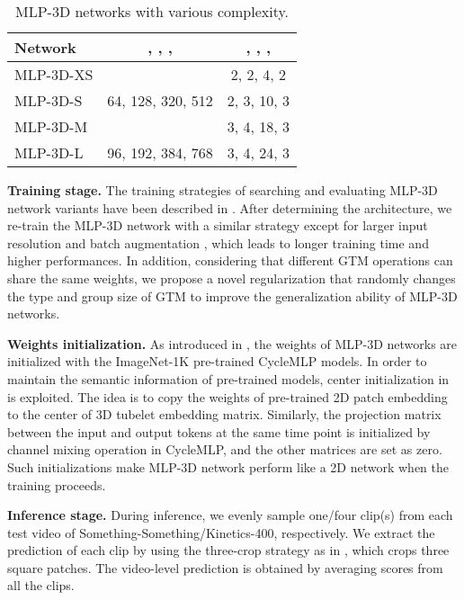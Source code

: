 \documentclass[10pt,twocolumn,letterpaper]{article}
\begin{document}
\begin{table}[!tb]
\centering
\small
\caption{\small MLP-3D networks with various complexity.}
\vspace{-0.1in}
\begin{tabularx}{0.42\textwidth}{X|c|c}
\toprule
\textbf{Network} & , , ,  & , , ,  \\
\midrule
MLP-3D-XS & \multirow{3}{*}{64, 128, 320, 512} & 2, 2, 4, 2 \\
MLP-3D-S &  & 2, 3, 10, 3 \\
MLP-3D-M &  & 3, 4, 18, 3 \\ \midrule
MLP-3D-L & 96, 192, 384, 768 & 3, 4, 24, 3 \\
\bottomrule
\end{tabularx}
\label{tab:ss}
\vspace{-0.2in}
\end{table}

\textbf{Training stage.} The training strategies of searching and evaluating MLP-3D network variants have been described in . After determining the architecture, we re-train the MLP-3D network with a similar strategy except for larger input resolution and batch augmentation \cite{hoffer2020augment}, which leads to longer training time and higher performances. In addition, considering that different GTM operations can share the same weights, we propose a novel regularization that randomly changes the type and group size of GTM to improve the generalization ability of MLP-3D networks.

\textbf{Weights initialization.} As introduced in , the weights of MLP-3D networks are initialized with the ImageNet-1K pre-trained CycleMLP models. In order to maintain the semantic information of pre-trained models, center initialization in \cite{arnab2021vivit} is exploited. The idea is to copy the weights of pre-trained 2D patch embedding to the center of 3D tubelet embedding matrix. Similarly, the projection matrix  between the input and output tokens at the same time point is initialized by channel mixing operation in CycleMLP, and the other matrices  are set as zero. Such initializations make MLP-3D network perform like a 2D network when the training proceeds.

\textbf{Inference stage.} During inference, we evenly sample one/four clip(s) from each test video of Something-Something/Kinetics-400, respectively. We extract the prediction of each clip by using the three-crop strategy as in \cite{feichtenhofer2019slowfast}, which crops three square patches. The video-level prediction is obtained by averaging scores from all the clips.
\end{document}
